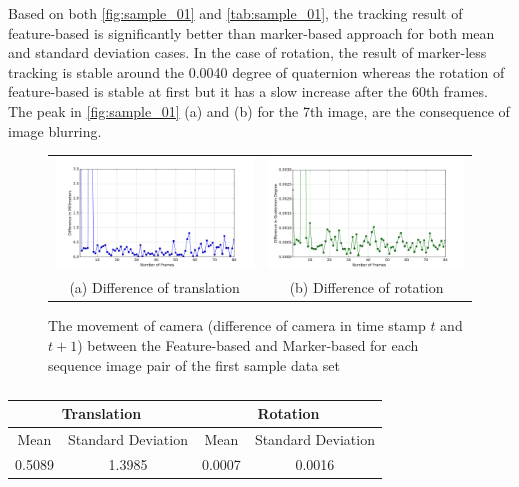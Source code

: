 Based on both \autoref{fig:sample_01} and \autoref{tab:sample_01}, the tracking result of feature-based is significantly better than marker-based approach for both mean and standard deviation cases. In the case of rotation, the result of marker-less tracking is stable around the 0.0040 degree of quaternion whereas the rotation of feature-based is stable at first but it has a slow increase after the 60th frames. The peak in \autoref{fig:sample_01} (a) and (b) for the 7th image, are the consequence of image blurring. 

\begin{figure}[H]
\begin{tabular}{cc}
  \includegraphics[width=80mm]{figures/diff_0/graph_translation} &  \includegraphics[width=80mm]{figures/diff_0/graph_rotation} \\
(a) Difference of translation & (b) Difference of rotation \\[6pt]
\end{tabular}
\caption{The movement of camera (difference of camera in time stamp $t$ and $t+1$) between the Feature-based and Marker-based for each sequence image pair of the first sample data set}\label{fig:sample_01_diff}
\end{figure}

\begin{table}[H]
\centering
  \begin{tabular}{| c | c | c | c |}
      \hline
      \multicolumn{2}{|c|}{Translation} & \multicolumn{2}{c|}{Rotation} \\ \hline
       Mean & Standard Deviation & Mean & Standard Deviation \\ \hline
      0.5089 & 1.3985 & 0.0007 & 0.0016 \\ \hline
  \end{tabular}
  \caption{} \label{tab:sample_01_diff}
\end{table}


